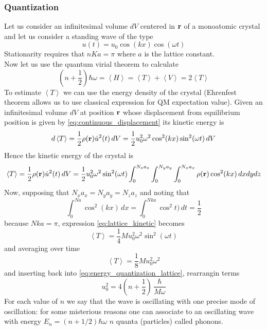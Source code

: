 \subsubsection*{Quantization}
Let us consider an infinitesimal volume $dV$ centered in $\mathbf{r}$ of a monoatomic crystal and let us consider a standing wave of the type 
\begin{equation}
    u(t) = u_0 \cos(kx)\cos(\omega t)
    \label{eq:continuous_displacement}
\end{equation}
Stationarity requires that $nKa = \pi$ where $a$ is the lattice constant. \\
Now let us use the quantum virial theorem to calculate
\begin{equation*}
    \left(n + \frac{1}{2}\right) \hbar \omega = \left\langle H \right\rangle = 
    \left\langle T \right\rangle + \left\langle V \right\rangle = 2\left\langle T \right\rangle
    \label{eq:energy_quantization_lattice}
\end{equation*}
To estimate $\left\langle T \right\rangle$ we can use the energy density of the crystal (Ehrenfest theorem allows us to use classical expression for QM expectation value).
Given an infinitesimal volume $dV$ at position $\mathbf{r}$ whose displacement from equilibrium position is given by \ref{eq:continuous_displacement} its kinetic energy is
$$d\left\langle T \right\rangle = \frac{1}{2}\rho(\mathbf{r})\dot u^2(t) \, dV = \frac{1}{2}u_0^2\omega^2\cos^2(kx)\sin^2(\omega t) \, dV$$
Hence the kinetic energy of the crystal is 
\begin{equation}
    \left\langle T \right\rangle = \frac{1}{2}\rho(\mathbf{r})\dot u^2(t) \, dV = \frac{1}{2}u_0^2\omega^2\sin^2(\omega t) \int_0^{N_z a_z}\int_0^{N_y a_y}\int_0^{N_x a_x}\rho(\mathbf{r})\cos^2(kx) \, dxdydz
    \label{eq:lattice_kinetic}
\end{equation}
Now, supposing that $N_x a_x = N_y a_y = N_z a_z$ and noting that 
\begin{equation*}
    \int_0^{N a} \cos^2(kx) \, dx = \int_0^{N k a} \cos^2t) \, dt = \frac{1}{2}
\end{equation*}
because $Nka=\pi$, expression \ref{eq:lattice_kinetic} becomes
\begin{equation*}
    \left\langle T \right\rangle = \frac{1}{4} Mu_0^2\omega^2\sin^2(\omega t)
\end{equation*}
and averaging over time 
\begin{equation}
    \left\langle T \right\rangle = \frac{1}{8} Mu_0^2\omega^2
\end{equation}
and inserting back into \ref{eq:energy_quantization_lattice}, rearrangin terms
\begin{equation*}
    u_0^2 = 4\left(n+\frac{1}{2}\right) \, \frac{\hbar}{M\omega}
\end{equation*}
For each value of $n$ we say that the wave is oscillating with one precise mode of oscillation: for some misterious reasons one can associate 
to an oscillating wave with energy $E_n = \left(n+1/2\right)\hbar \omega$ $n$ quanta (particles) called phonons.
